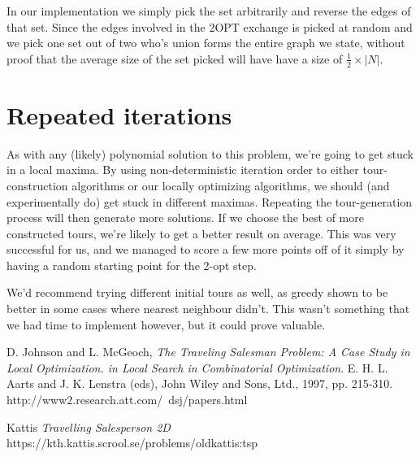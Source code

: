 \documentclass[a4paper,12pt,oneside]{article}
\begin{document}
In our implementation we simply pick the set arbitrarily and reverse the edges of that set. Since the edges involved in the 2OPT exchange is picked at random and we pick one set out of two who's union forms the entire graph we state, without proof that the average size of the set picked will have have a size of $\frac{1}{2} \times |N|$.



\section{Repeated iterations}

As with any (likely) polynomial solution to this problem, we're going to get stuck in a local maxima. By using non-deterministic iteration order to either tour-construction algorithms or our locally optimizing algorithms, we should (and experimentally do) get stuck in different maximas. Repeating the tour-generation process will then generate more solutions. If we choose the best of more constructed tours, we're likely to get a better result on average. This was very successful for us, and we managed to score a few more points off of it simply by having a random starting point for the 2-opt step.

We'd recommend trying different initial tours as well, as greedy shown to be better in some cases where nearest neighbour didn't. This wasn't something that we had time to implement however, but it could prove valuable.

\begin{thebibliography}{9}

	D. Johnson and L. McGeoch,
	\emph{The Traveling Salesman Problem: A Case Study in Local Optimization. in Local Search in Combinatorial Optimization}.
	E. H. L. Aarts and J. K. Lenstra (eds), John Wiley and Sons, Ltd., 1997, pp. 215-310. http://www2.research.att.com/~dsj/papers.html

	Kattis
	\emph{Travelling Salesperson 2D}
	https://kth.kattis.scrool.se/problems/oldkattis:tsp

\end{thebibliography}
\end{document}
